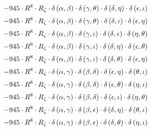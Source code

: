 \begin{subequations}
\begin{gather}
 \\[0.2em] \notag 		 - 945 \cdot R^{8} \cdot R_{\zeta{}} \cdot \delta{}\left(\alpha{}, \beta{}\right) \cdot \delta{}\left(\gamma{}, \theta{}\right) \cdot \delta{}\left(\delta{}, \eta{}\right) \cdot \delta{}\left(\epsilon{}, \iota{}\right) 
 \\[0.2em] \notag 		 - 945 \cdot R^{8} \cdot R_{\zeta{}} \cdot \delta{}\left(\alpha{}, \beta{}\right) \cdot \delta{}\left(\gamma{}, \theta{}\right) \cdot \delta{}\left(\delta{}, \iota{}\right) \cdot \delta{}\left(\epsilon{}, \eta{}\right) 
 \\[0.2em] \notag 		 - 945 \cdot R^{8} \cdot R_{\zeta{}} \cdot \delta{}\left(\alpha{}, \beta{}\right) \cdot \delta{}\left(\gamma{}, \iota{}\right) \cdot \delta{}\left(\delta{}, \epsilon{}\right) \cdot \delta{}\left(\eta{}, \theta{}\right) 
 \\[0.2em] \notag 		 - 945 \cdot R^{8} \cdot R_{\zeta{}} \cdot \delta{}\left(\alpha{}, \beta{}\right) \cdot \delta{}\left(\gamma{}, \iota{}\right) \cdot \delta{}\left(\delta{}, \eta{}\right) \cdot \delta{}\left(\epsilon{}, \theta{}\right) 
 \\[0.2em] \notag 		 - 945 \cdot R^{8} \cdot R_{\zeta{}} \cdot \delta{}\left(\alpha{}, \beta{}\right) \cdot \delta{}\left(\gamma{}, \iota{}\right) \cdot \delta{}\left(\delta{}, \theta{}\right) \cdot \delta{}\left(\epsilon{}, \eta{}\right) 
 \\[0.2em] \notag 		 - 945 \cdot R^{8} \cdot R_{\zeta{}} \cdot \delta{}\left(\alpha{}, \gamma{}\right) \cdot \delta{}\left(\beta{}, \delta{}\right) \cdot \delta{}\left(\epsilon{}, \eta{}\right) \cdot \delta{}\left(\theta{}, \iota{}\right) 
 \\[0.2em] \notag 		 - 945 \cdot R^{8} \cdot R_{\zeta{}} \cdot \delta{}\left(\alpha{}, \gamma{}\right) \cdot \delta{}\left(\beta{}, \delta{}\right) \cdot \delta{}\left(\epsilon{}, \theta{}\right) \cdot \delta{}\left(\eta{}, \iota{}\right) 
 \\[0.2em] \notag 		 - 945 \cdot R^{8} \cdot R_{\zeta{}} \cdot \delta{}\left(\alpha{}, \gamma{}\right) \cdot \delta{}\left(\beta{}, \delta{}\right) \cdot \delta{}\left(\epsilon{}, \iota{}\right) \cdot \delta{}\left(\eta{}, \theta{}\right) 
 \\[0.2em] \notag 		 - 945 \cdot R^{8} \cdot R_{\zeta{}} \cdot \delta{}\left(\alpha{}, \gamma{}\right) \cdot \delta{}\left(\beta{}, \epsilon{}\right) \cdot \delta{}\left(\delta{}, \eta{}\right) \cdot \delta{}\left(\theta{}, \iota{}\right) 
 \\[0.2em] \notag 		 - 945 \cdot R^{8} \cdot R_{\zeta{}} \cdot \delta{}\left(\alpha{}, \gamma{}\right) \cdot \delta{}\left(\beta{}, \epsilon{}\right) \cdot \delta{}\left(\delta{}, \theta{}\right) \cdot \delta{}\left(\eta{}, \iota{}\right) 

\end{gather}
\end{subequations}

